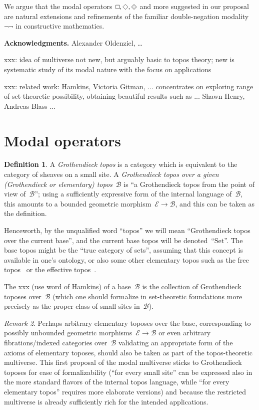 \documentclass[oneside,reqno]{amsart}
\theoremstyle{definition}
\newtheorem{defn}{Definition}[section]
\theoremstyle{plain}
\theoremstyle{remark}
\newtheorem{rem}[defn]{Remark}
\newcommand{\E}{\mathcal{E}}
\newcommand{\B}{\mathcal{B}}
\newcommand{\Set}{\mathrm{Set}}
\renewcommand{\_}{\mathpunct{.}\,}
\DeclareMathOperator{\possible}{\text{\tikz[scale=.6ex/1cm,baseline=-.6ex,rotate=45,line width=.1ex]{\draw (-1,-1) rectangle (1,1);}}}
\DeclareMathOperator{\necessary}{\text{\tikz[scale=.6ex/1cm,baseline=-.6ex,line width=.1ex]{\draw (-1,-1) rectangle (1,1);}}}
\DeclareMathOperator{\xpossible}{\text{\tikz[scale=.6ex/1cm,baseline=-.6ex,rotate=45,line width=.1ex]{\draw (-1,-1) rectangle (1,1); \draw[very thin] (-.6,-.6) rectangle (.6,.6);}}}
\newcommand{\?}{\,{:}\,}
\begin{document}
We argue that the modal operators~$\necessary,\possible,\xpossible$ and more
suggested in our proposal are natural extensions and refinements of the
familiar double-negation modality~$\neg\neg$ in constructive mathematics.

\textbf{Acknowledgments.} Alexander Oldenziel, \ldots

xxx: idea of multiverse not new, but arguably basic to topos theory; new is systematic
study of its modal nature with the focus on applications

xxx: related work: Hamkins, Victoria Gitman, ... concentrates on exploring
range of set-theoretic possibility, obtaining beautiful results such as ...
Shawn Henry, Andreas Blass ...


\section{Modal operators}
\label{sect:defn-modalities}

\begin{defn}A \emph{Grothendieck topos} is a category which is equivalent to
the category of sheaves on a small site. A \emph{Grothendieck topos over a
given (Grothendieck or elementary) topos}~$\B$ is ``a Grothendieck topos from
the point of view of~$\B$''; using a sufficiently expressive form of the
internal language of~$\B$, this amounts to a bounded geometric morphism~$\E \to
\B$, and this can be taken as the definition.
\end{defn}

Henceworth, by the unqualified word ``topos'' we will mean ``Grothendieck topos
over the current base'', and the current base topos will be denoted~``$\Set$''.
The base topos might be the ``true category of sets'', assuming that this
concept is available in one's ontology, or also some other elementary topos
such as the free topos~\cite{xxx} or the ef{}fective topos~\cite{xxx}.

The xxx (use word of Hamkins) of a base~$\B$ is the collection of Grothendieck
toposes over~$\B$ (which one should formalize in set-theoretic foundations more
precisely as the proper class of small sites in~$\B$).

\begin{rem}Perhaps arbitrary elementary toposes over the base, corresponding to
possibly unbounded geometric morphisms~$\E \to \B$ or even arbitrary
fibrations/indexed categories over~$\B$ validating an appropriate form of the
axioms of elementary toposes, should also be
taken as part of the topos-theoretic multiverse. This first proposal of the
modal multiverse sticks to Grothendieck toposes for ease of
formalizability (``for every small site'' can be expressed also in the more
standard flavors of the internal topos language, while ``for every elementary
topos'' requires more elaborate versions) and because the restricted multiverse
is already sufficiently rich for the intended applications.
\end{rem}
\end{document}
